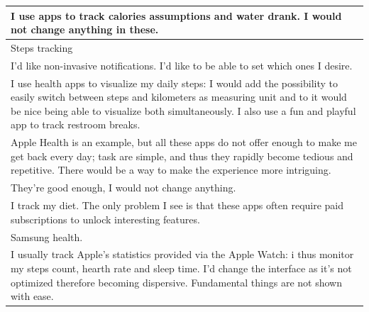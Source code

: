 \documentclass{article}
\begin{document}
\begin{table}[H]
\begin{tabularx}{0.9\textwidth}{X}
		\hline
		I use apps to track calories assumptions and water drank. I would not change anything in these.                                                                                                                                                                            \\
		\hline
		Steps tracking                                                                                                                                                                                                                                                             \\
		\hline
		I'd like non-invasive notifications. I'd like to be able to set which ones I desire.                                                                                                                                                                                       \\
		\hline
		I use health apps to visualize my daily steps: I would add the possibility to easily switch between steps and kilometers as measuring unit and to it would be nice being able to visualize both simultaneously. I also use a fun and playful app to track restroom breaks. \\
		\hline
		Apple Health is an example, but all these apps do not offer enough to make me get back every day; task are simple, and thus they rapidly become tedious and repetitive. There would be a way to make the experience more intriguing.                                       \\
		\hline
		They're good enough, I would not change anything.                                                                                                                                                                                                                          \\
		\hline
		I track my diet. The only problem I see is that these apps often require paid subscriptions to unlock interesting features.                                                                                                                                                \\
		\hline
		Samsung health.                                                                                                                                                                                                                                                            \\
		\hline
		I usually track Apple's statistics provided via the Apple Watch: i thus monitor my steps count, hearth rate and sleep time. I'd change the interface as it's not optimized therefore becoming dispersive. Fundamental things are not shown with ease.                      \\

\end{tabularx}
\end{table}
\end{document}
